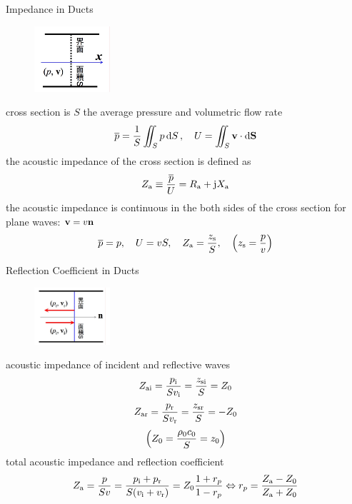 \documentclass[9pt,mathserif]{beamer}
\let\emph\relax %
\begin{document}
\begin{frame}{Impedance in Ducts}
	\begin{figure}
		\centering
		\includegraphics[width=0.25\textwidth]{img/duct/acousticImpedanceInDucts.jpg}
	\end{figure}
	\begin{outline}
		\1 cross section is $S$
		\1 the \emph{spatial} average pressure and volumetric flow rate
		$$\overline{p} = \frac1S \iint_S p\dd{S}
		\qc U = \iint_S \vb{v}\cdot \dd{\vb{S}}$$
		\1 the acoustic impedance of the cross section is defined as
		$$Z_\text{a} \equiv \frac{\overline{p}}{U} = R_\text{a} +\mathrm{j} X_\text{a}$$
		\1 the acoustic impedance is continuous in the both sides of the 
		cross section
		\1 for plane waves: $\vb{v} = v\vb{n}$
		$$\overline{p} = p\qc U = vS\qc Z\st{a} = \frac{z\st{s}}{S}
		\qc \qty(z\st{s}=\frac{p}{v})$$
	\end{outline}
\end{frame}

\begin{frame}{Reflection Coefficient in Ducts}
	\begin{figure}
		\centering
		\includegraphics[width=0.25\textwidth]{img/duct/reflectionCoefInDucts.jpg}
	\end{figure}
	\begin{outline}
		\1 acoustic impedance of incident and reflective waves
		$$
		Z_\text{ai} = \frac{p_\text{i}}{Sv_\text{i}} = \frac{z_\text{si}}{S} = Z_0
		$$
		$$
		Z_\text{ar} = \frac{p_\text{r}}{Sv_\text{r}} = \frac{z_\text{sr}}{S} = -Z_0
		$$
		$$
		\qty(Z_0 = \frac{\rho_0c_0}{S}=z_0)
		$$
		\1 total acoustic impedance and reflection coefficient
		$$
		Z_\text{a} = \frac{p}{Sv} = \frac{p_\text{i}+p_\text{r}}{S(v_\text{i}+v_\text{r})}
		=Z_0 \frac{1+r_p}{1-r_p}
		\Leftrightarrow
		r_p = 
		\frac{Z_\text{a}-Z_0}{Z_\text{a}+Z_0}$$
	\end{outline}
\end{frame}
\end{document}
